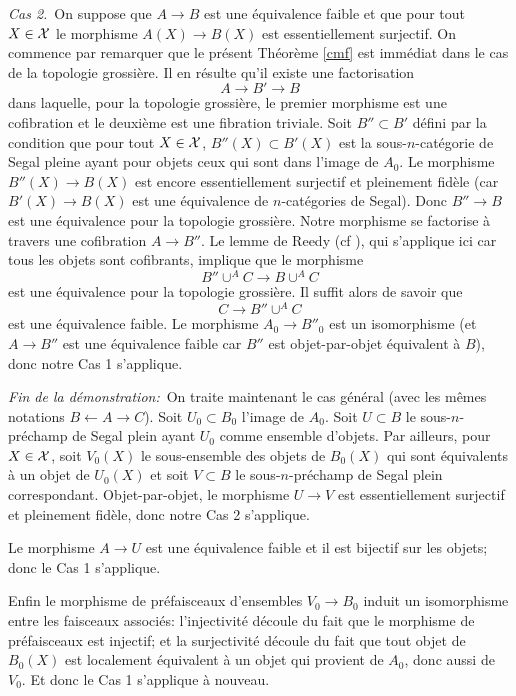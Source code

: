 \documentclass[12pt]{article}
\newcommand{\Xx}{{\cal X}}
\begin{document}
\noindent
{\em Cas 2.}\, On suppose que $A\rightarrow B$ est une \'equivalence
faible et que pour tout
$X\in \Xx$ le morphisme $A(X)\rightarrow B(X)$ est essentiellement
surjectif.
On commence par remarquer que le pr\'esent Th\'eor\`eme \ref{cmf} est
imm\'ediat
dans le cas de la topologie
grossi\`ere.
Il en r\'esulte qu'il existe une factorisation
$$
A\rightarrow B' \rightarrow B
$$
dans laquelle, pour la topologie grossi\`ere,
le premier morphisme est une cofibration et le deuxi\`eme
est une fibration triviale.
Soit $B'' \subset B'$ d\'efini par la condition que pour tout
$X\in \Xx$, $B''(X) \subset B'(X)$ est la sous-$n$-cat\'egorie de Segal pleine
ayant pour objets ceux qui sont dans l'image de $A_0$. Le morphisme
$B'' (X)\rightarrow B(X)$ est encore essentiellement surjectif et
pleinement fid\`ele (car $B'(X)\rightarrow B(X)$ est une
\'equivalence de $n$-cat\'egories de Segal). Donc $B'' \rightarrow B$ est
une \'equivalence pour la topologie grossi\`ere.
Notre morphisme se factorise
\`a travers une cofibration $A\rightarrow B''$.
Le lemme de Reedy \cite{Reedy}
(cf \cite{Hirschhorn} \cite{DHK} \cite{HoveyBook} \cite{JardineGoerssBook}),
qui s'applique ici car tous les objets sont cofibrants, implique que le
morphisme
$$
B'' \cup ^A C \rightarrow B\cup ^AC
$$
est une \'equivalence pour la topologie grossi\`ere. Il suffit alors de savoir
que
$$
C \rightarrow B'' \cup ^A C
$$
est une \'equivalence faible. Le morphisme $A_0\rightarrow B''_0$ est un
isomorphisme (et $A\rightarrow B''$ est une \'equivalence faible car $B''$ est
objet-par-objet \'equivalent \`a $B$), donc notre Cas 1 s'applique.

\medskip

\noindent
{\em Fin de la d\'emonstration:}\,
On traite maintenant le cas g\'en\'eral (avec les m\^emes notations
$B\leftarrow A\rightarrow C$). Soit $U_0\subset B_0$ l'image de $A_0$. Soit
$U\subset B$ le sous-$n$-pr\'echamp de Segal plein ayant $U_0$ comme
ensemble d'objets. Par ailleurs,
pour $X\in \Xx$, soit $V_0(X)$ le sous-ensemble des objets de $B_0(X)$
qui sont \'equivalents \`a un objet de $U_0(X)$ et soit $V\subset B$ le
sous-$n$-pr\'echamp de Segal plein correspondant. Objet-par-objet, le morphisme
$U\rightarrow V$ est essentiellement surjectif et pleinement
fid\`ele, donc notre Cas 2 s'applique.

Le morphisme $A\rightarrow U$ est une \'equivalence faible et il est bijectif
sur les objets; donc le Cas 1 s'applique.

Enfin le morphisme de pr\'efaisceaux d'ensembles $V_0\rightarrow B_0$ induit un
isomorphisme entre les faisceaux associ\'es: l'injectivit\'e d\'ecoule du
fait que le
morphisme de pr\'efaisceaux est injectif; et la surjectivit\'e d\'ecoule du
fait que
tout objet de $B_0(X)$ est localement \'equivalent \`a un objet qui provient de
$A_0$, donc aussi de $V_0$. Et donc le Cas 1 s'applique \`a nouveau.
\end{document}
